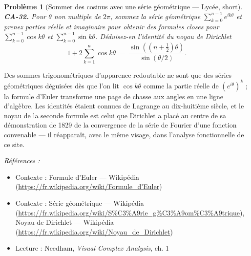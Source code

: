 \documentclass[11pt]{article}
\newtheorem{problem}{Problème}
\newenvironment{refs}{\par\small\noindent\emph{Références :}\begin{itemize}\setlength\itemsep{0pt}}{\end{itemize}\normalsize}
\begin{document}
\bigskip

\begin{problem}[{Sommer des cosinus avec une série géométrique --- Lycée, short}]
\textbf{CA-32.} Pour $ \theta $ non multiple de $ 2\pi $, sommez la série
géométrique $ \sum_{k=0}^{n-1} e^{ik\theta} $ et prenez parties réelle et imaginaire pour obtenir
des formules closes pour $ \sum_{k=0}^{n-1} \cos k\theta $ et $ \sum_{k=0}^{n-1} \sin k\theta $.
Déduisez-en l'identité du noyau de Dirichlet
\[ 1 + 2\sum_{k=1}^{n} \cos k\theta \;=\; \frac{\sin\!\left(\left(n + \tfrac{1}{2}\right)\theta\right)}{\sin(\theta/2)} . \]
\end{problem}

\noindent Des sommes trigonométriques d'apparence redoutable ne sont que des séries
géométriques déguisées dès que l'on lit $ \cos k\theta $ comme la partie réelle de
$ (e^{i\theta})^k $ ; la formule d'Euler transforme une page de chasse aux angles en une ligne
d'algèbre. Les identités étaient connues de Lagrange au dix-huitième siècle, et le noyau de la
seconde formule est celui que Dirichlet a placé au centre de sa démonstration de 1829 de la
convergence de la série de Fourier d'une fonction convenable --- il réapparaît, avec le même visage,
dans l'analyse fonctionnelle de ce site.

\begin{refs}
\item Contexte : Formule d'Euler --- Wikipédia (\url{https://fr.wikipedia.org/wiki/Formule_d'Euler})
\item Contexte : Série géométrique --- Wikipédia (\url{https://fr.wikipedia.org/wiki/S%C3%A9rie_g%C3%A9om%C3%A9trique}), Noyau de Dirichlet --- Wikipédia (\url{https://fr.wikipedia.org/wiki/Noyau_de_Dirichlet})
\item Lecture : Needham, \textit{Visual Complex Analysis}, ch. 1
\end{refs}

\bigskip
\end{document}
